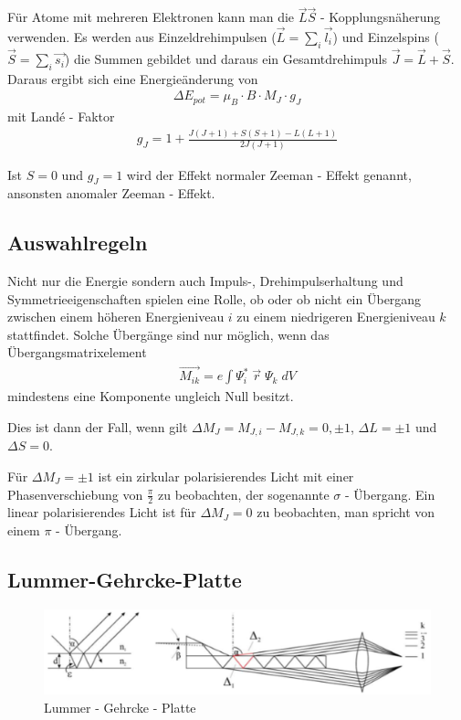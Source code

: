     Für Atome mit mehreren Elektronen kann man die $\vec{L} \vec{S}$ - Kopplungsnäherung verwenden. Es werden aus Einzeldrehimpulsen ($\vec{L} = \sum_i \vec{l_i}$) und Einzelspins ($\vec{S} = \sum_i \vec{s_i}$) die Summen gebildet und daraus ein Gesamtdrehimpuls $\vec{J} = \vec{L} + \vec{S}$. Daraus ergibt sich eine Energieänderung von
    \begin{align}
    	\Delta E_{pot} = \mu_B \cdot B \cdot M_J \cdot g_J
    \end{align}
    mit Landé - Faktor
    \begin{align}
    	g_J = 1 + \frac{J(J + 1) + S(S + 1) - L(L + 1)}{2J(J + 1)}
    \end{align}

    Ist $S = 0$ und $g_J = 1$ wird der Effekt normaler Zeeman - Effekt genannt, ansonsten anomaler Zeeman - Effekt.

  \subsection{Auswahlregeln}
    Nicht nur die Energie sondern auch Impuls-, Drehimpulserhaltung und Symmetrieeigenschaften spielen eine Rolle, ob oder ob nicht ein Übergang zwischen einem höheren Energieniveau $i$ zu einem niedrigeren Energieniveau $k$ stattfindet. Solche Übergänge sind nur möglich, wenn das Übergangsmatrixelement
    \begin{align}
    	\vec{M_{ik}} = e \int \Psi_i^* \; \vec{r} \; \Psi_k \; dV
    \end{align}
    mindestens eine Komponente ungleich Null besitzt.

    Dies ist dann der Fall, wenn gilt $\Delta M_J = M_{J,i} - M_{J,k} = 0, \pm 1$, $\Delta L = \pm 1$ und $\Delta S = 0$.

    Für $\Delta M_J = \pm 1$ ist ein zirkular polarisierendes Licht mit einer Phasenverschiebung von $\frac{\pi}{2}$ zu beobachten, der sogenannte $\sigma$ - Übergang. Ein linear polarisierendes Licht ist für $\Delta M_J = 0$ zu beobachten, man spricht von einem $\pi$ - Übergang.

  \subsection{Lummer-Gehrcke-Platte}
    \begin{figure}[H]
    	\centering
    	\includegraphics[scale=0.5]{parts/lummerGehrckePlate}
    	\caption{Lummer - Gehrcke - Platte}\label{fig:lummerGehrckePlatte}
    \end{figure}


